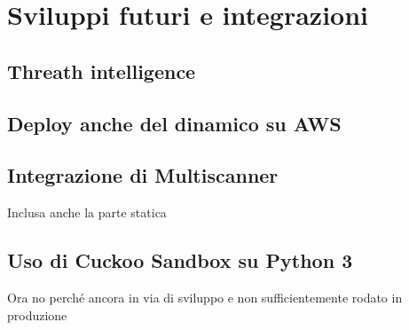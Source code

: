 \chapter{Sviluppi futuri e integrazioni}

\section{Threath intelligence}

\section{Deploy anche del dinamico su AWS}

\section{Integrazione di Multiscanner}
Inclusa anche la parte statica

\section{Uso di Cuckoo Sandbox su Python 3}
Ora no perché ancora in via di sviluppo e non sufficientemente rodato in produzione